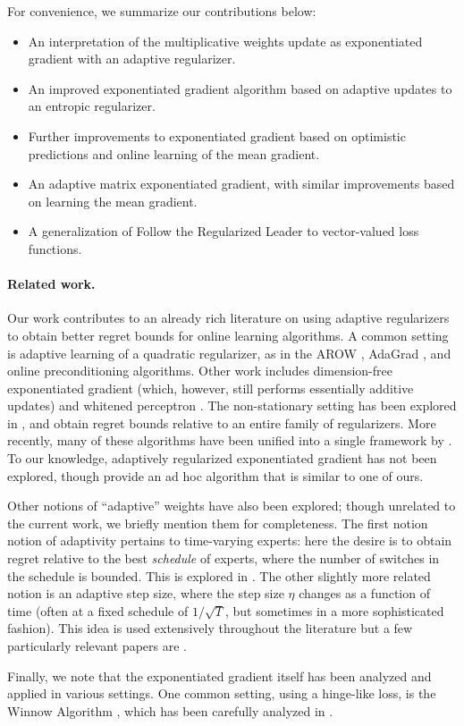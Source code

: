 \documentclass[paper_icml.tex]{subfiles}
\begin{document}
For convenience, we summarize our contributions below:
\begin{itemize}
\item An interpretation of the multiplicative weights update as 
      exponentiated gradient with an adaptive regularizer.
\item An improved exponentiated gradient algorithm based on adaptive 
      updates to an entropic regularizer.
\item Further improvements to exponentiated gradient based on optimistic 
      predictions and online learning of the mean gradient.
\item An adaptive matrix exponentiated gradient, with similar improvements 
      based on learning the mean gradient.
\item A generalization of Follow the Regularized Leader to vector-valued 
      loss functions.
\end{itemize}

\paragraph{Related work.} Our work contributes to an already rich literature 
on using adaptive regularizers to obtain 
better regret bounds for online learning algorithms. A common setting is 
adaptive learning of a quadratic regularizer, as in the AROW 
\cite{crammer2009arow}, AdaGrad \cite{duchi2011adagrad}, and online 
preconditioning \cite{streeter2010} algorithms. 
Other work includes dimension-free 
exponentiated gradient \cite{orabona2013dimension} (which, however, 
still performs essentially additive updates) and whitened perceptron 
\cite{cesa2005perceptron}. The non-stationary setting has been explored 
in \cite{vaits2013}, and \cite{mcmahan2010adaptive} obtain regret bounds 
relative to an entire family of regularizers. More recently, many of these 
algorithms have been unified into a single framework by \cite{orabona2013general}.
To our knowledge, adaptively regularized exponentiated gradient has not 
been explored, though \cite{hazan2010variation} provide an ad hoc algorithm 
that is similar to one of ours.

Other notions of ``adaptive'' weights have also been explored; though unrelated 
to the current work, we briefly mention them for completeness. The first notion 
notion of adaptivity pertains to time-varying experts: here the desire is to 
obtain regret relative to the best \emph{schedule} of experts, where the number 
of switches in the schedule is bounded. This is explored in \cite{switching}. 
The other slightly more related notion is an adaptive step size, where the step 
size $\eta$ changes as a function of time (often at a fixed schedule of 
$1/\sqrt{T}$, but sometimes in a more sophisticated fashion). This idea is used 
extensively throughout the literature but a few particularly relevant papers are 
\cite{adaptive-step}.

Finally, we note that the exponentiated gradient itself has been analyzed 
and applied in various settings. One common setting, using a hinge-like loss, 
is the Winnow Algorithm \cite{winnow}, which has been carefully analyzed in 
\cite{winnow-careful}.
\end{document}
